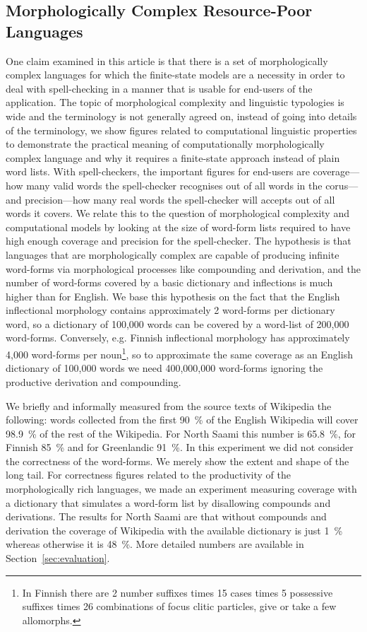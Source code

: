\documentclass[a4paper,12pt]{article}
\begin{document}
\subsection{Morphologically Complex Resource-Poor Languages}
\label{subsec:morphologically-complex}

One claim examined in this article is that there is a set of morphologically
complex languages for which the finite-state models are a necessity in order to
deal with spell-checking in a manner that is usable for end-users of the
application.  The topic of morphological complexity and linguistic typologies
is wide and the terminology is not generally agreed on, instead of going into
details of the terminology, we show figures related to computational linguistic
properties to demonstrate the practical meaning of computationally
morphologically complex language and why it requires a finite-state approach
instead of plain word lists. With spell-checkers, the important figures for
end-users are coverage---how many valid words the spell-checker recognises out
of all words in the corus---and precision---how many real words the
spell-checker will accepts out of all words it covers.  We relate this to the
question of morphological complexity and computational models by looking at the
size of word-form lists required to have high enough coverage and precision for
the spell-checker. The hypothesis is that languages that are morphologically
complex are capable of producing infinite word-forms via morphological
processes like compounding and derivation, and the number of word-forms covered
by a basic dictionary and inflections is much higher than for English. We base
this hypothesis on the fact that the English inflectional morphology contains
approximately 2 word-forms per dictionary word, so a dictionary of 100,000
words can be covered by a word-list of 200,000 word-forms. Conversely, e.g.
Finnish inflectional morphology has approximately 4,000 word-forms per
noun\footnote{In Finnish there are 2 number suffixes times 15 cases times 5
possessive suffixes times 26 combinations of focus clitic particles, give or
take a few allomorphs.}, so to approximate the same coverage as an English
dictionary of 100,000 words we need 400,000,000 word-forms ignoring the
productive derivation and compounding.

We briefly and informally measured from the source texts of Wikipedia the
following: words collected from the first 90~\% of the English Wikipedia will
cover 98.9~\% of the rest of the Wikipedia. For North Saami this number is
65.8~\%, for Finnish 85~\% and for Greenlandic 91~\%. In this experiment we did
not consider the correctness of the word-forms. We merely show the extent and
shape of the long tail. For correctness figures related to the productivity of
the morphologically rich languages, we made an experiment measuring coverage
with a dictionary that simulates a word-form list by disallowing compounds and
derivations. The results for North Saami are that without compounds and
derivation the coverage of Wikipedia with the available dictionary is just 1~\%
whereas otherwise it is 48~\%. More detailed numbers are available in
Section~\ref{sec:evaluation}.
\end{document}
